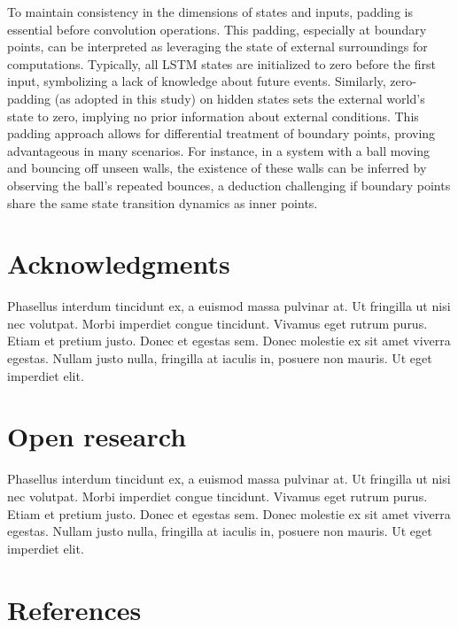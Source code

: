 \documentclass[
]{agujournal2019}
\newlength{\cslhangindent}
\newlength{\cslentryspacingunit} %
\newenvironment{CSLReferences}[2] %
 {%
  \setlength{\parindent}{0pt}
  \ifodd #1
  \let\oldpar\par
  \def\par{\hangindent=\cslhangindent\oldpar}
  \fi
  \setlength{\parskip}{#2\cslentryspacingunit}
 }%
 {}
\begin{document}
To maintain consistency in the dimensions of states and inputs, padding
is essential before convolution operations. This padding, especially at
boundary points, can be interpreted as leveraging the state of external
surroundings for computations. Typically, all LSTM states are
initialized to zero before the first input, symbolizing a lack of
knowledge about future events. Similarly, zero-padding (as adopted in
this study) on hidden states sets the external world's state to zero,
implying no prior information about external conditions. This padding
approach allows for differential treatment of boundary points, proving
advantageous in many scenarios. For instance, in a system with a ball
moving and bouncing off unseen walls, the existence of these walls can
be inferred by observing the ball's repeated bounces, a deduction
challenging if boundary points share the same state transition dynamics
as inner points.

\hypertarget{acknowledgments}{%
\section{Acknowledgments}\label{acknowledgments}}

Phasellus interdum tincidunt ex, a euismod massa pulvinar at. Ut
fringilla ut nisi nec volutpat. Morbi imperdiet congue tincidunt.
Vivamus eget rutrum purus. Etiam et pretium justo. Donec et egestas sem.
Donec molestie ex sit amet viverra egestas. Nullam justo nulla,
fringilla at iaculis in, posuere non mauris. Ut eget imperdiet elit.

\hypertarget{open-research}{%
\section{Open research}\label{open-research}}

Phasellus interdum tincidunt ex, a euismod massa pulvinar at. Ut
fringilla ut nisi nec volutpat. Morbi imperdiet congue tincidunt.
Vivamus eget rutrum purus. Etiam et pretium justo. Donec et egestas sem.
Donec molestie ex sit amet viverra egestas. Nullam justo nulla,
fringilla at iaculis in, posuere non mauris. Ut eget imperdiet elit.

\hypertarget{references}{%
\section*{References}\label{references}}

\hypertarget{refs}{}
\begin{CSLReferences}{0}{0}
\vspace{1em}

\end{CSLReferences}
\end{document}

